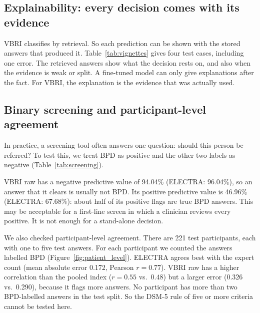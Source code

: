 \documentclass[11pt]{article}
\newcommand{\vbri}{VBRI}
\newcommand{\dsmv}{DSM-5}
\begin{document}
\subsection{Explainability: every decision comes with its evidence}

\vbri{} classifies by retrieval. So each prediction can be shown with the stored answers that
produced it. Table~\ref{tab:vignettes} gives four test cases, including one error. The retrieved
answers show what the decision rests on, and also when the evidence is weak or split. A fine-tuned
model can only give explanations after the fact. For \vbri{}, the explanation is the evidence that
was actually used.

\begin{table}[H]
\centering
\caption{Test cases with the retrieved neighbours (similarity in brackets).}
\label{tab:vignettes}
\scriptsize
\setlength{\tabcolsep}{4pt}
\resizebox{\textwidth}{!}{%
}
\end{table}

\subsection{Binary screening and participant-level agreement}

In practice, a screening tool often answers one question: should this person be referred? To test
this, we treat BPD as positive and the other two labels as negative (Table~\ref{tab:screening}).

\begin{table}[H]
\centering
\caption{Binary screening view (BPD vs.\ not BPD) on the test set ($N=333$, 67 positive). Values in
\%, except AUROC.}
\label{tab:screening}
\small
\resizebox{\textwidth}{!}{%
}
\end{table}

\vbri{} raw has a negative predictive value of 94.04\% (ELECTRA: 96.04\%), so an answer that it
clears is usually not BPD. Its positive predictive value is 46.96\% (ELECTRA: 67.68\%): about half of
its positive flags are true BPD answers. This may be acceptable for a first-line screen in which a
clinician reviews every positive. It is not enough for a stand-alone decision.

We also checked participant-level agreement. There are 221 test participants, each with one to five
test answers. For each participant we counted the answers labelled BPD (Figure~\ref{fig:patient_level}).
ELECTRA agrees best with the expert count (mean absolute error 0.172, Pearson $r=0.77$). \vbri{} raw
has a higher correlation than the pooled index ($r=0.55$ vs.\ $0.48$) but a larger error (0.326 vs.\
0.290), because it flags more answers. No participant has more than two BPD-labelled answers in the
test split. So the \dsmv{} rule of five or more criteria cannot be tested here.
\end{document}
